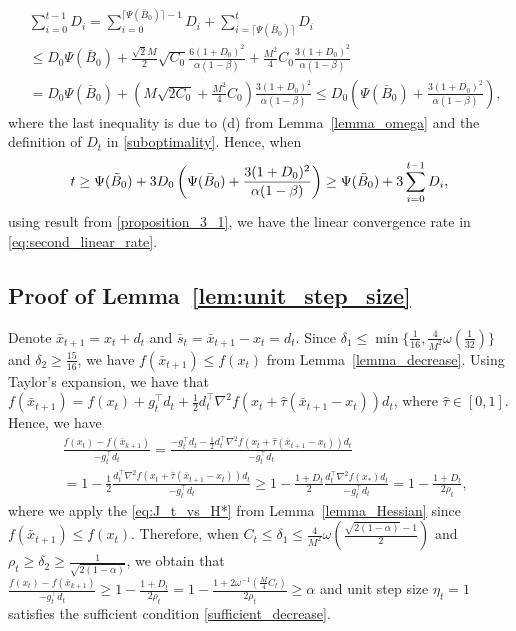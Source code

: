 \documentclass[11pt,letterpaper]{article}
\newcommand\ceil[1]{\lceil #1 \rceil}
\newcommand\0{{\Vector{0}}}
\newcommand\1{{\Vector{1}}}
\numberwithin{assumption}{section}
\numberwithin{definition}{section}
\numberwithin{theorem}{section}
\numberwithin{remark}{section}
\begin{document}
    \begin{equation}\label{sum_of_C_t}
    \begin{split}
        & \sum_{i = 0}^{t - 1} D_i = \sum_{i=0}^{\ceil{\Psi(\bar{B}_0)}-1} D_i + \sum_{i=\ceil{\Psi(\bar{B}_0)}}^t D_i \\
        & \leq D_0 \Psi(\bar{B}_{0}) + \frac{\sqrt{2}M}{2}\sqrt{C_0}\frac{6(1 + D_0)^2}{\alpha(1 - \beta)} + \frac{M^2}{4}C_0\frac{3(1 + D_0)^2}{\alpha(1 - \beta)} \\
        & = D_0\Psi(\bar{B}_{0}) + (M\sqrt{2C_0} + \frac{M^2}{4}C_0)\frac{3(1 + D_0)^2}{\alpha(1 - \beta)} \leq D_0\left(\Psi(\bar{B}_{0}) + \frac{3(1 + D_0)^2}{\alpha(1 - \beta)}\right),
    \end{split}
    \end{equation}
    where the last inequality is due to (d) from Lemma~\ref{lemma_omega} and the definition of $D_t$ in \eqref{suboptimality}. Hence, when 
    $$
    t \geq \Psi(\Tilde{B}_{0}) + 3D_0\left(\Psi(\bar{B}_{0}) + \frac{3(1 + D_0)^2}{\alpha(1 - \beta)}\right) \geq \Psi(\Tilde{B}_{0}) + 3\sum_{i = 0}^{t - 1} D_i,
    $$
    using result from \eqref{proposition_3_1}, we have the linear convergence rate in \eqref{eq:second_linear_rate}.

\subsection{Proof of Lemma~\ref{lem:unit_step_size}}\label{proof_lem:unit_step_size}

    Denote $\bar{x}_{t + 1} = x_t + d_t$ and $\bar{s}_t = \bar{x}_{t + 1} - x_t = d_t$. Since $\delta_1 \leq \min\{\frac{1}{16}, \frac{4}{M^2}\omega(\frac{1}{32})\}$ and $\delta_2 \geq \frac{15}{16}$, we have $f(\bar{x}_{t + 1}) \leq f(x_t)$ from Lemma~\ref{lemma_decrease}. Using Taylor's expansion, we have that $f(\bar{x}_{t + 1}) = f(x_t) + g_t^\top d_t + \frac{1}{2}d_t^\top \nabla^2{f(x_t + \hat{\tau} (\bar{x}_{t + 1} - x_{t}))}d_t$, where $\hat{\tau} \in [0, 1]$. Hence, we have
    \begin{equation*}%
    \begin{split}
        & \frac{f(x_t) - f(\bar{x}_{k+1})}{-g_t^\top d_t} = \frac{-g_t^\top d_t - \frac{1}{2}d_t^\top \nabla^2{f(x_t + \hat{\tau} (\bar{x}_{t + 1} - x_{t}))}d_t}{-g_t^\top d_t} \\
        & = 1 - \frac{1}{2}\frac{d_t^\top \nabla^2{f(x_t + \hat{\tau} (\bar{x}_{t + 1} - x_{t}))}d_t}{-g_t^\top d_t} \geq 1 - \frac{1 + D_t}{2}\frac{d_t^\top \nabla^2{f(x_*)}d_t}{-g_t^\top d_t} = 1 - \frac{1 + D_t}{2\rho_t},
    \end{split}
    \end{equation*}
    where we apply the \eqref{eq:J_t_vs_H*} from Lemma~\ref{lemma_Hessian} since $f(\bar{x}_{t + 1}) \leq f(x_t)$. Therefore, when $C_t \leq \delta_1 \leq \frac{4}{M^2}\omega(\frac{\sqrt{2(1 - \alpha)}- 1}{2})$ and $\rho_t \geq \delta_2 \geq \frac{1}{\sqrt{2(1 - \alpha)}}$, we obtain that $\frac{f(x_t) - f(\bar{x}_{k+1})}{-g_t^\top d_t} \geq 1 - \frac{1 + D_t}{2\rho_t} = 1 - \frac{1 + 2\omega^{-1}(\frac{M}{4}C_t)}{2\rho_t} \geq \alpha$ and unit step size $\eta_t = 1$ satisfies the sufficient condition \eqref{sufficient_decrease}. 
    
\end{document}
